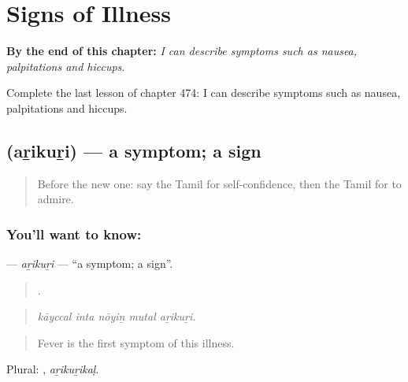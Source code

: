 
\chapter{Signs of Illness}
\label{ch:ta-signs-of-illness}

\begin{chapteropening}
\textbf{By the end of this chapter:} \emph{I can describe symptoms such as nausea, palpitations and hiccups.}

Complete the last lesson of chapter 474: I can describe symptoms such as nausea, palpitations and hiccups.
\end{chapteropening}

\section[\texorpdfstring{\ta{அறிகுறி} (aṟikuṟi)}{அறிகுறி (aṟikuṟi)}]{ (aṟikuṟi) — a symptom; a sign}

\label{lesson:TA-C474-arikuri}



\begin{quote}
Before the new one: say the Tamil for self-confidence, then the Tamil for to admire.
\end{quote}

\subsection*{You'll want to know: }
\textbf{} — \emph{aṟikuṟi} — \textquotedblleft{}a symptom; a sign\textquotedblright{}.

\begin{quote}
    .
\end{quote}

\begin{quote}
\emph{kāyccal inta nōyiṉ mutal aṟikuṟi.}
\end{quote}

\begin{quote}
Fever is the first symptom of this illness.
\end{quote}

Plural: , \emph{aṟikuṟikaḷ}.

